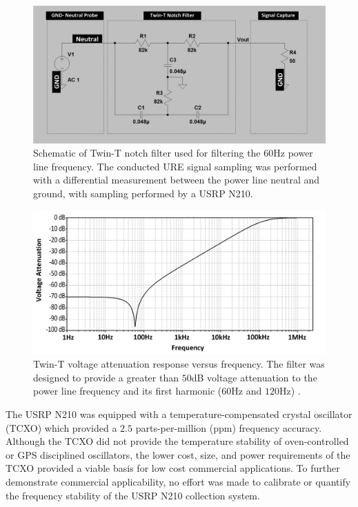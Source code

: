 \begin{figure}[tb]
	\includegraphics[width=\textwidth]{./data_collection_results/filter_schematic}
	\centering
	\caption{Schematic of Twin-T notch filter used for filtering the $60$Hz power line frequency.  The conducted URE signal sampling was performed with a differential measurement between the power line neutral and ground, with sampling performed by a USRP N210.}
	\label{fig:twint_filter_schematic}
\end{figure}

\begin{figure}[tb]
	\includegraphics[width=\textwidth]{./data_collection_results/filter_response.jpg}
	\centering
	\caption{Twin-T voltage attenuation response versus frequency.  The filter was designed to provide a greater than $50$dB voltage attenuation to the power line frequency and its first harmonic ($60$Hz and $120$Hz) \cite{Cooke2016}.}
	\label{fig:twint_filter_response}
\end{figure}

The USRP N210 was equipped with a temperature-compensated crystal oscillator (TCXO) which provided a $2.5$ parts-per-million (ppm) frequency accuracy.  Although the TCXO did not provide the temperature stability of oven-controlled or GPS disciplined oscillators, the lower cost, size, and power requirements of the TCXO provided a viable basis for low cost commercial applications.  To further demonstrate commercial applicability, no effort was made to calibrate or quantify the frequency stability of the USRP N210 collection system.

